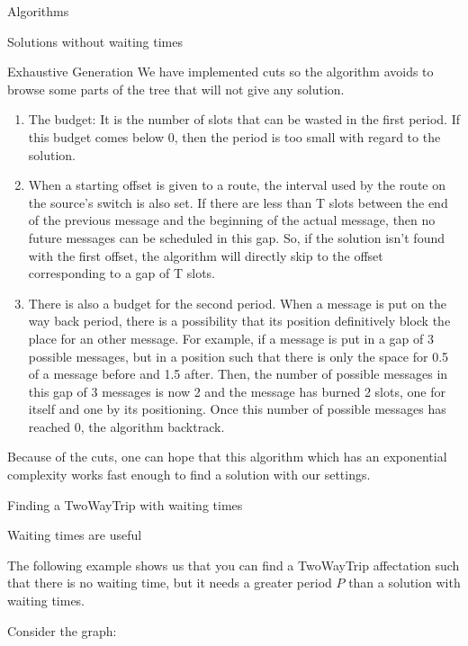 \documentclass[a4paper,10pt]{report}
\begin{document}
\begin{chapter}{Algorithms}
\begin{section}{Solutions without waiting times}
\begin{subsection}{Exhaustive Generation}
We have implemented cuts so the algorithm avoids to browse some parts of the tree that will not give any solution.
\begin{enumerate}
 \item The budget: It is the number of slots that can be wasted in the first period. If this budget comes below 0, then the period is too small with regard to
 the solution.
 \item When a starting offset is given to a route, the interval used by the route on the source's switch is also set. If there are less than T slots
 between the end of the previous message and the beginning of the actual message, then no future messages can be scheduled in this gap.
 So, if the solution isn't found with the first offset, the algorithm will directly skip to the offset corresponding to a gap of T slots.
 \item There is also a budget for the second period. When a message is put on the way back period, there is a possibility that its position definitively block the place for an other message. For example, if a message is put in a gap of 3 possible messages, but in a position such that there is only the space for 0.5 of a message before and 1.5 after. Then, the number of possible messages in this gap of 3 messages is now 2 and the message has burned 2 slots, one for itself and one by its positioning.
 Once this number of possible messages has reached 0, the algorithm backtrack.
\end{enumerate}

Because of the cuts, one can hope that this algorithm which has an exponential complexity works fast enough to find a solution with our settings.

\end{subsection}

 \end{section}

\begin{section}{Finding a TwoWayTrip with waiting times}
\begin{subsection}{Waiting times are useful}
 
The following example shows us that you can find a TwoWayTrip affectation such that there is no waiting time, but it needs a greater period $P$ than a
solution with waiting times.

Consider the graph:


\begin{center}
\end{center}
\end{subsection}
\end{section}
\end{chapter}
\end{document}
